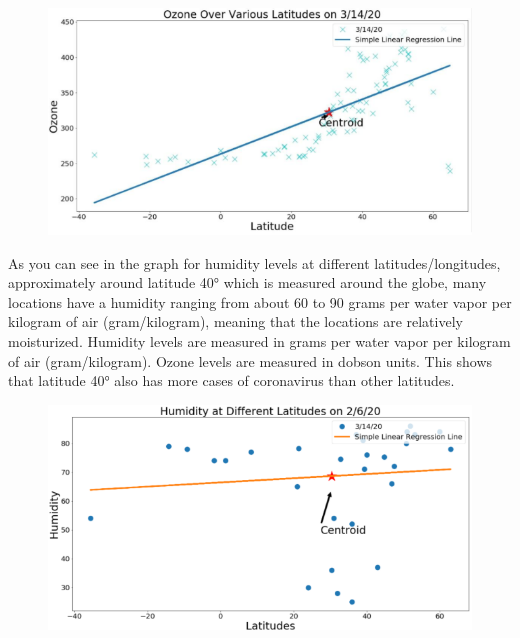 \documentclass[10pt,journal,compsoc]{IEEEtran}
\begin{document}
{{\begin{figure}[!htbp] %
	\includegraphics[scale=0.6]{ozone-mar-centroid.png}\\ 
	\centering
	\label{LP-COVID-Ozone March 14th}
\end{figure}

	As you can see in the graph for humidity levels at different latitudes/longitudes, approximately around latitude 40° which is measured around the globe, many locations have a humidity ranging from about 60 to 90 grams per water vapor per kilogram of air (gram/kilogram), meaning that the locations are relatively moisturized. Humidity levels are measured in grams per water vapor per kilogram of air (gram/kilogram). Ozone levels are measured in dobson units. This shows that latitude 40° also has more cases of coronavirus than other latitudes.

\begin{figure}[!htbp] %
	\includegraphics[scale=0.6]{humidity-feb-centroid.png}\\
	\centering
	\label{LP-COVID-Humidity February 26th}
\end{figure}

}}
\end{document}
